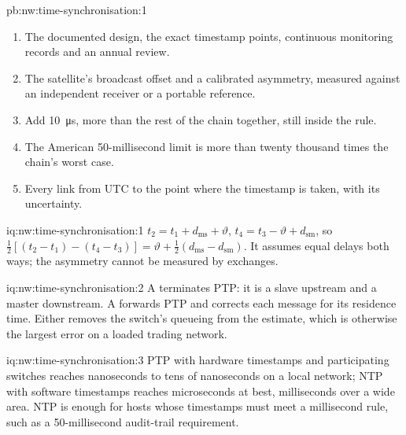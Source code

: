 \begin{solution}{pb:nw:time-synchronisation:1}
\begin{enumerate}
\item The documented design, the exact timestamp points, continuous monitoring records and an annual review.
\item The satellite's broadcast offset and a calibrated asymmetry, measured against an independent receiver or a portable reference.
\item Add \qty{10}{\micro\second}, more than the rest of the chain together, still inside the rule.
\item The American 50-millisecond limit is more than twenty thousand times the chain's worst case.
\item Every link from UTC to the point where the timestamp is taken, with its uncertainty.
\end{enumerate}
\end{solution}

\begin{solution}{iq:nw:time-synchronisation:1}
$t_2 = t_1 + d_{\mathrm{ms}} + \vartheta$, $t_4 = t_3 - \vartheta + d_{\mathrm{sm}}$, so
$\tfrac12[(t_2 - t_1) - (t_4 - t_3)] = \vartheta + \tfrac12(d_{\mathrm{ms}} - d_{\mathrm{sm}})$. It assumes equal delays both ways; the
asymmetry cannot be measured by exchanges.
\end{solution}

\begin{solution}{iq:nw:time-synchronisation:2}
A  terminates PTP: it is a slave upstream and a master downstream. A  forwards PTP and corrects each
message for its residence time. Either removes the switch's queueing from the estimate, which is otherwise the largest error on a
loaded trading network.
\end{solution}

\begin{solution}{iq:nw:time-synchronisation:3}
PTP with hardware timestamps and participating switches reaches nanoseconds to tens of nanoseconds on a local network; NTP with
software timestamps reaches microseconds at best, milliseconds over a wide area. NTP is enough for hosts whose timestamps must meet a
millisecond rule, such as a 50-millisecond audit-trail requirement.
\end{solution}

